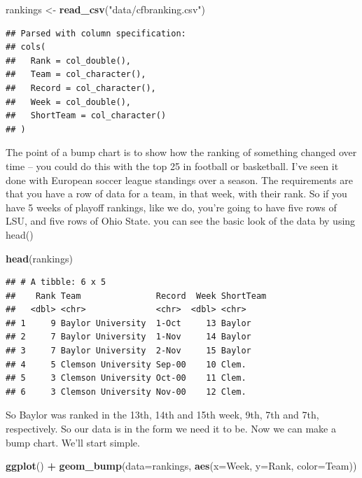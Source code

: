 \documentclass[
]{book}
\newenvironment{Shaded}{\begin{snugshade}}{\end{snugshade}}
\newcommand{\DataTypeTok}[1]{\textcolor[rgb]{0.13,0.29,0.53}{#1}}
\newcommand{\KeywordTok}[1]{\textcolor[rgb]{0.13,0.29,0.53}{\textbf{#1}}}
\newcommand{\NormalTok}[1]{#1}
\newcommand{\OperatorTok}[1]{\textcolor[rgb]{0.81,0.36,0.00}{\textbf{#1}}}
\newcommand{\StringTok}[1]{\textcolor[rgb]{0.31,0.60,0.02}{#1}}
\begin{document}
\begin{Shaded}
\begin{Highlighting}[]
\NormalTok{rankings <-}\StringTok{ }\KeywordTok{read_csv}\NormalTok{(}\StringTok{"data/cfbranking.csv"}\NormalTok{)}
\end{Highlighting}
\end{Shaded}

\begin{verbatim}
## Parsed with column specification:
## cols(
##   Rank = col_double(),
##   Team = col_character(),
##   Record = col_character(),
##   Week = col_double(),
##   ShortTeam = col_character()
## )
\end{verbatim}

The point of a bump chart is to show how the ranking of something changed over time -- you could do this with the top 25 in football or basketball. I've seen it done with European soccer league standings over a season. The requirements are that you have a row of data for a team, in that week, with their rank. So if you have 5 weeks of playoff rankings, like we do, you're going to have five rows of LSU, and five rows of Ohio State. you can see the basic look of the data by using head()

\begin{Shaded}
\begin{Highlighting}[]
\KeywordTok{head}\NormalTok{(rankings)}
\end{Highlighting}
\end{Shaded}

\begin{verbatim}
## # A tibble: 6 x 5
##    Rank Team               Record  Week ShortTeam
##   <dbl> <chr>              <chr>  <dbl> <chr>    
## 1     9 Baylor University  1-Oct     13 Baylor   
## 2     7 Baylor University  1-Nov     14 Baylor   
## 3     7 Baylor University  2-Nov     15 Baylor   
## 4     5 Clemson University Sep-00    10 Clem.    
## 5     3 Clemson University Oct-00    11 Clem.    
## 6     3 Clemson University Nov-00    12 Clem.
\end{verbatim}

So Baylor was ranked in the 13th, 14th and 15th week, 9th, 7th and 7th, respectively. So our data is in the form we need it to be. Now we can make a bump chart. We'll start simple.

\begin{Shaded}
\begin{Highlighting}[]
\KeywordTok{ggplot}\NormalTok{() }\OperatorTok{+}\StringTok{ }\KeywordTok{geom_bump}\NormalTok{(}\DataTypeTok{data=}\NormalTok{rankings, }\KeywordTok{aes}\NormalTok{(}\DataTypeTok{x=}\NormalTok{Week, }\DataTypeTok{y=}\NormalTok{Rank, }\DataTypeTok{color=}\NormalTok{Team))}
\end{Highlighting}
\end{Shaded}
\end{document}
